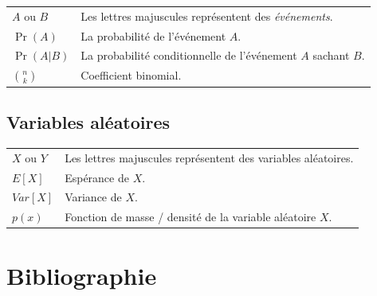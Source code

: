 \documentclass[
  a4paper,11pt,twoside,onecolumn,openright,final,oldfontcommands]{memoir}
\newcommand\nomenclature[2]{#1 & #2 \\}
\theoremstyle{definition}
\theoremstyle{definition}
\theoremstyle{definition}
\theoremstyle{definition}
\theoremstyle{remark}
\begin{document}
\begin{longtable}{@{}p{2cm}@{}p{\dimexpr\textwidth-2cm\relax}@{}}

\nomenclature{$A$ ou $B$}{Les lettres majuscules représentent des \textit{événements}.}
\nomenclature{$\Pr(A)$}{La probabilité de l'événement $A$.}
\nomenclature{$\Pr(A | B)$}{La probabilité conditionnelle de l'événement $A$ sachant $B$.}
\nomenclature{$\binom{n}{k}$}{Coefficient binomial.}

\end{longtable}

\hypertarget{variables-aluxe9atoires}{%
\section*{Variables aléatoires}\label{variables-aluxe9atoires}}

\begin{longtable}{@{}p{2cm}@{}p{\dimexpr\textwidth-2cm\relax}@{}}

\nomenclature{$X$ ou $Y$}{Les lettres majuscules représentent des variables aléatoires.}
\nomenclature{$E[X]$}{Espérance de $X$.}
\nomenclature{$Var[X]$}{Variance de $X$.}
\nomenclature{$p(x)$}{Fonction de masse / densité de la variable aléatoire $X$.}

\end{longtable}

\hypertarget{bibliographie}{%
\chapter*{Bibliographie}\label{bibliographie}}


\setlength{\parindent}{-0.5in}
\setlength{\parskip}{8pt}
\end{document}
